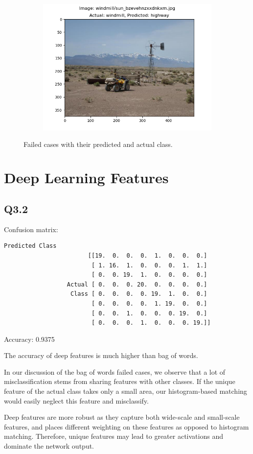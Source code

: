 \documentclass{article} %
\begin{document}
\begin{figure}[h]
\begin{subfigure}[b]{0.333\textwidth}
            \includegraphics[width=\textwidth]{q2,6_case_156.png}
        \end{subfigure}
        \caption{Failed cases with their predicted and actual class.}
        \label{q26}
    \end{figure}

    \section[3]{Deep Learning Features}
    \subsection*{Q3.2}
    Confusion matrix:
    \begin{Verbatim}[samepage=true]
                                  Predicted Class
                        [[19.  0.  0.  0.  1.  0.  0.  0.]
                         [ 1. 16.  1.  0.  0.  0.  1.  1.]
                         [ 0.  0. 19.  1.  0.  0.  0.  0.]
                  Actual [ 0.  0.  0. 20.  0.  0.  0.  0.]
                   Class [ 0.  0.  0.  0. 19.  1.  0.  0.]
                         [ 0.  0.  0.  0.  1. 19.  0.  0.]
                         [ 0.  0.  1.  0.  0.  0. 19.  0.]
                         [ 0.  0.  0.  1.  0.  0.  0. 19.]]
    \end{Verbatim}

    Accuracy: 0.9375
    \smallskip

    The accuracy of deep features is much higher than bag of words.
    \smallskip

    In our discussion of the bag of words failed cases, we observe that a lot of misclassification stems from sharing features with other classes. If the unique feature of the actual class takes only a small area, our histogram-based matching would easily neglect this feature and misclassify.
    \smallskip

    Deep features are more robust as they capture both wide-scale and small-scale features, and places different weighting on these features as opposed to histogram matching. Therefore, unique features may lead to greater activations and dominate the network output.
\end{document}
